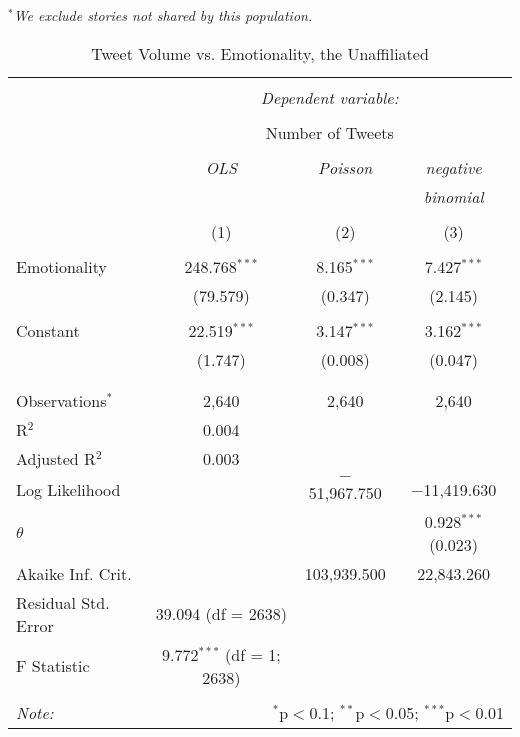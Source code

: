 \emph{$^{*}$We exclude stories not shared by this population.}  
\newpage 
\begin{table}[!htbp] \centering 
  \caption{Tweet Volume vs. Emotionality, the Unaffiliated} 
      \label{} 
    \begin{tabular}{@{\extracolsep{5pt}}lccc} 
    \\[-1.8ex]\hline 
    \hline \\[-1.8ex] 
     & \multicolumn{3}{c}{\textit{Dependent variable:}} \\ 
    \cline{2-4} 
    \\[-1.8ex] & \multicolumn{3}{c}{Number of Tweets} \\ 
    \\[-1.8ex] & \textit{OLS} & \textit{Poisson} & \textit{negative} \\ 
     & \textit{} & \textit{} & \textit{binomial} \\ 
    \\[-1.8ex] & (1) & (2) & (3)\\ 
    \hline \\[-1.8ex] 
     Emotionality & 248.768$^{***}$ & 8.165$^{***}$ & 7.427$^{***}$ \\ 
      & (79.579) & (0.347) & (2.145) \\ 
      & & & \\ 
     Constant & 22.519$^{***}$ & 3.147$^{***}$ & 3.162$^{***}$ \\ 
      & (1.747) & (0.008) & (0.047) \\ 
      & & & \\ 
    \hline \\[-1.8ex] 
    Observations$^{*}$ & 2,640 & 2,640 & 2,640 \\ 
    R$^{2}$ & 0.004 &  &  \\ 
    Adjusted R$^{2}$ & 0.003 &  &  \\ 
    Log Likelihood &  & $-$51,967.750 & $-$11,419.630 \\ 
    $\theta$ &  &  & 0.928$^{***}$  (0.023) \\ 
    Akaike Inf. Crit. &  & 103,939.500 & 22,843.260 \\ 
    Residual Std. Error & 39.094 (df = 2638) &  &  \\ 
    F Statistic & 9.772$^{***}$ (df = 1; 2638) &  &  \\ 
    \hline 
    \hline \\[-1.8ex] 
    \textit{Note:}  & \multicolumn{3}{r}{$^{*}$p$<$0.1; $^{**}$p$<$0.05; $^{***}$p$<$0.01} \\ 
    \end{tabular} 
\end{table}
